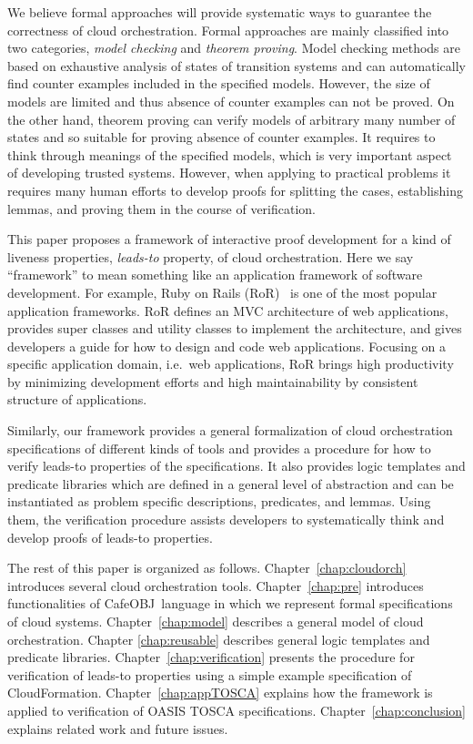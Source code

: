 \documentclass[12pt]{report}
\newcommand{\cafeobj}{{\sf CafeOBJ}~}
\begin{document}
We believe formal approaches will provide systematic ways to guarantee
the correctness of cloud orchestration. Formal approaches are mainly
classified into two categories, {\it model checking} and {\it theorem
  proving}. Model checking methods are based on exhaustive analysis of
states of transition systems and can automatically find counter
examples included in the specified models. However, the size of models
are limited and thus absence of counter examples can not be proved.
On the other hand, theorem proving can verify models of arbitrary many
number of states and so suitable for proving absence of counter
examples. It requires to think through meanings of the specified
models, which is very important aspect of developing trusted
systems. However, when applying to practical problems it requires many
human efforts to develop proofs for splitting the cases, establishing
lemmas, and proving them in the course of verification.

This paper proposes a framework of interactive proof development for a
kind of liveness properties, {\it leads-to} property, of cloud
orchestration. Here we say ``framework'' to mean something like an
application framework of software development. For example, Ruby on
Rails (RoR)~\cite{RoR} is one of the most popular application
frameworks. RoR defines an MVC architecture of web applications,
provides super classes and utility classes to implement the
architecture, and gives developers a guide for how to design and code
web applications. Focusing on a specific application domain, i.e.\ web
applications, RoR brings high productivity by minimizing development
efforts and high maintainability by consistent structure of
applications.

Similarly, our framework provides a general formalization of cloud
orchestration specifications of different kinds of tools and provides
a procedure for how to verify leads-to properties of the
specifications. It also provides logic templates and predicate
libraries which are defined in a general level of abstraction and can
be instantiated as problem specific descriptions, predicates,
and lemmas. Using them, the verification procedure assists developers
to systematically think and develop proofs of leads-to properties.

The rest of this paper is organized as
follows. Chapter~\ref{chap:cloudorch} introduces several cloud
orchestration tools. Chapter~\ref{chap:pre} introduces functionalities
of \cafeobj language in which we represent formal specifications of
cloud systems. Chapter~\ref{chap:model} describes a general model of
cloud orchestration. Chapter \ref{chap:reusable} describes general
logic templates and predicate
libraries. Chapter~\ref{chap:verification} presents the procedure for
verification of leads-to properties using a simple example
specification of CloudFormation. Chapter~\ref{chap:appTOSCA} explains
how the framework is applied to verification of OASIS TOSCA
specifications.  Chapter~\ref{chap:conclusion} explains related work
and future issues.
\end{document}
